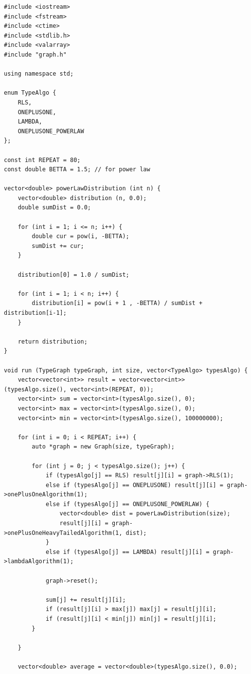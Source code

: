 \documentclass[times]{itmo-student-thesis}
\newcommand{\ollga}{${(1 + (\lambda , \lambda))}$-ГА\xspace}
\begin{document}
\begin{lstlisting}[caption={Реализация \ollga со сбором статистики},label={ollgaStat}]
#include <iostream>
#include <fstream>
#include <ctime>
#include <stdlib.h>
#include <valarray>
#include "graph.h"

using namespace std;

enum TypeAlgo {
    RLS,
    ONEPLUSONE,
    LAMBDA,
    ONEPLUSONE_POWERLAW
};

const int REPEAT = 80;
const double BETTA = 1.5; // for power law

vector<double> powerLawDistribution (int n) {
    vector<double> distribution (n, 0.0);
    double sumDist = 0.0;

    for (int i = 1; i <= n; i++) {
        double cur = pow(i, -BETTA);
        sumDist += cur;
    }

    distribution[0] = 1.0 / sumDist;

    for (int i = 1; i < n; i++) {
        distribution[i] = pow(i + 1 , -BETTA) / sumDist + distribution[i-1];
    }

    return distribution;
}

void run (TypeGraph typeGraph, int size, vector<TypeAlgo> typesAlgo) {
    vector<vector<int>> result = vector<vector<int>> (typesAlgo.size(), vector<int>(REPEAT, 0));
    vector<int> sum = vector<int>(typesAlgo.size(), 0);
    vector<int> max = vector<int>(typesAlgo.size(), 0);
    vector<int> min = vector<int>(typesAlgo.size(), 100000000);

    for (int i = 0; i < REPEAT; i++) {
        auto *graph = new Graph(size, typeGraph);

        for (int j = 0; j < typesAlgo.size(); j++) {
            if (typesAlgo[j] == RLS) result[j][i] = graph->RLS(1);
            else if (typesAlgo[j] == ONEPLUSONE) result[j][i] = graph->onePlusOneAlgorithm(1);
            else if (typesAlgo[j] == ONEPLUSONE_POWERLAW) {
                vector<double> dist = powerLawDistribution(size);
                result[j][i] = graph->onePlusOneHeavyTailedAlgorithm(1, dist);
            }
            else if (typesAlgo[j] == LAMBDA) result[j][i] = graph->lambdaAlgorithm(1);

            graph->reset();

            sum[j] += result[j][i];
            if (result[j][i] > max[j]) max[j] = result[j][i];
            if (result[j][i] < min[j]) min[j] = result[j][i];
        }

    }

    vector<double> average = vector<double>(typesAlgo.size(), 0.0);


\end{lstlisting}
\end{document}
